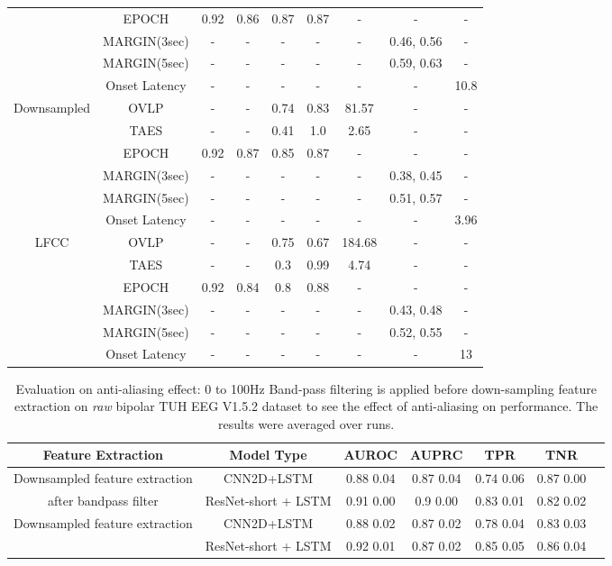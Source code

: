 \documentclass[pmlr,twocolumn,10pt]{jmlr}
\begin{document}
\begin{table*}[ht!]
\begin{tabular}{c|c|ccccccc}
		& EPOCH & 0.92 & 0.86 & 0.87 & 0.87 & - & - & - \\
		& MARGIN(3sec)  & - & - & - & - & - & 0.46, 0.56 & - \\
		& MARGIN(5sec) & - & - & - & - & - & 0.59, 0.63 & - \\
		& Onset Latency & - & - & - & - & - & - & 10.8 \\
		\midrule
		\multirow{6}{*}{Downsampled} 
		& OVLP & - & - & 0.74 & 0.83 & 81.57 & - & - \\
		& TAES & - & - & 0.41 & 1.0 & 2.65 & - & - \\
		& EPOCH & 0.92 & 0.87 & 0.85 & 0.87 & - & - & - \\
		& MARGIN(3sec)  & - & - & - & - & - & 0.38, 0.45 & - \\
		& MARGIN(5sec) & - & - & - & - & - & 0.51, 0.57 & - \\
		& Onset Latency & - & - & - & - & - & - & 3.96 \\
		\midrule
		\multirow{6}{*}{LFCC} 
		& OVLP & - & - & 0.75 & 0.67 & 184.68 & - & - \\
		& TAES & - & - & 0.3 & 0.99 & 4.74 & - & - \\
		& EPOCH & 0.92 & 0.84 & 0.8 & 0.88 & - & - & - \\
		& MARGIN(3sec)  & - & - & - & - & - & 0.43, 0.48 & - \\
		& MARGIN(5sec) & - & - & - & - & - & 0.52, 0.55 & - \\
		& Onset Latency & - & - & - & - & - & - & 13 \\
		\bottomrule
	\end{tabular}
\end{table*}
 \begin{table*}[ht!]
	\small
	\centering
	\caption{Evaluation on anti-aliasing effect: 0 to 100Hz Band-pass filtering is applied before down-sampling feature extraction on \textit{raw} bipolar TUH EEG V1.5.2 dataset to see the effect of anti-aliasing on performance. The results were averaged over  runs.}
	\label{antialiasing}
	\begin{tabular}{c|c|ccccc}
		\toprule
		Feature Extraction & Model Type & AUROC & AUPRC & TPR & TNR\\
		\midrule
		Downsampled feature extraction
		&CNN2D+LSTM 
		& 0.88  0.04
		& 0.87  0.04
		& 0.74  0.06 
		& 0.87  0.00
		\\
		after bandpass filter &ResNet-short + LSTM
		& 0.91  0.00 
		& 0.9  0.00
		& 0.83  0.01 
		& 0.82  0.02 \\
	
		\midrule
		\multirow{2}{*}{Downsampled feature extraction}
		&CNN2D+LSTM 
		& 0.88  0.02
		& 0.87  0.02
		& 0.78  0.04
		& 0.83  0.03
		\\
		&ResNet-short + LSTM
		& 0.92  0.01 
		& 0.87  0.02 
		& 0.85  0.05 
		& 0.86  0.04
		\\


		\bottomrule
	\end{tabular}
\end{table*}  
\end{document}
